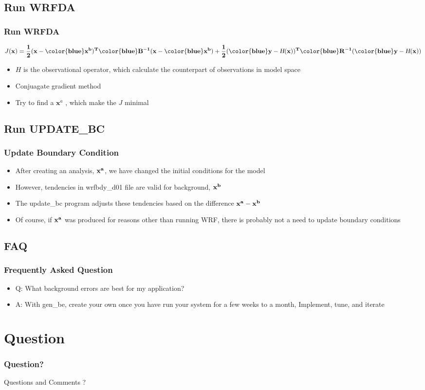 \documentclass{beamer}
\begin{document}
\subsection{Run WRFDA}
\begin{frame}
\frametitle{Run WRFDA}
\begin{equation*}
J(\bf{x})=\frac{1}{2}(\bf{x}-{\color{blue}\bf{x}^b})^T{\color{blue}\bf{B}^{-1}}(\bf{x}-{\color{blue}\bf{x}^b})+\frac{1}{2}({\color{blue}\bf{y}}-\textsl{H}(\bf{x}))^T{\color{blue}\bf{R}^{-1}}({\color{blue}\bf{y}}-\textsl{H}(\bf{x}))
\end{equation*}
\begin{itemize}
\item $H$ is the observational operator, which calculate the counterpart of observations in model space \pause
\item Conjuagate gradient method
\item Try to find a $\mathbf{x}^a$ , which make the $J$ minimal
\end{itemize}
\end{frame}

\subsection{Run UPDATE\_BC}
\begin{frame}
\frametitle{Update Boundary Condition}
\begin{itemize}
\item After creating an analysis, $\bf{x^a}$, we have changed
the initial conditions for the model \pause
\item However, tendencies in wrfbdy\_d01 file are valid for background, $\bf{x^b}$ \pause
\item The update\_bc program adjusts these tendencies
based on the difference $\bf{x^a - x^b}$ \pause
\item Of course, if $\bf{x^a}$ was produced for reasons other
than running WRF, there is probably not a need to
update boundary conditions
\end{itemize}
\end{frame}

\subsection{FAQ}
\begin{frame}
\frametitle{Frequently Asked Question}
\begin{itemize}
\item Q: What background errors are best for my application? \pause
\item \alert{A: With gen\_be, create your own once you have run your
system for a few weeks to a month, Implement, tune, and iterate}
\end{itemize}
\end{frame}


\section{Question}
\begin{frame}
\frametitle{Question?}
\begin{center}
Questions and Comments ?
\end{center}
\end{frame}
\end{document}
